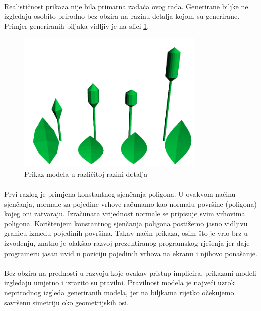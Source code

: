 \documentclass[times, utf8, diplomski]{fer}
\begin{document}
\paragraph{}
Realističnost prikaza nije bila primarna zadaća ovog rada. Generirane biljke ne 
izgledaju osobito prirodno bez obzira na razinu detalja kojom su generirane. Primjer generiranih biljaka vidljiv je na slici \ref{fig:51-1}.
\begin{figure}[h]
	\centering
	\includegraphics[width=0.8\textwidth]{img/51-1}
	\caption{Prikaz modela u različitoj razini detalja}
	\label{fig:51-1}
\end{figure}
\paragraph{}
Prvi razlog je primjena konstantnog sjenčanja poligona. U ovakvom načinu 
sjenčanja, normale za pojedine vrhove računamo kao normalu površine (poligona)
kojeg oni zatvaraju. Izračunata vrijednost normale se pripisuje svim vrhovima
poligona. Korištenjem konstantnog sjenčanja poligona postižemo jasno 
vidljivu granicu između pojedinih površina. Takav način prikaza, osim što je
vrlo brz u izvođenju, znatno je olakšao razvoj prezentiranog programskog 
rješenja jer daje programeru jasan uvid u poziciju pojedinih vrhova na ekranu
i njihovo ponašanje. 

\paragraph{}
Bez obzira na prednosti u razvoju koje ovakav pristup implicira, prikazani 
modeli izgledaju umjetno i izrazito su pravilni. Pravilnost modela je najveći
uzrok neprirodnog izgleda generiranih modela, jer na biljkama rijetko očekujemo
savršenu simetriju oko geometrijskih osi.
\end{document}
